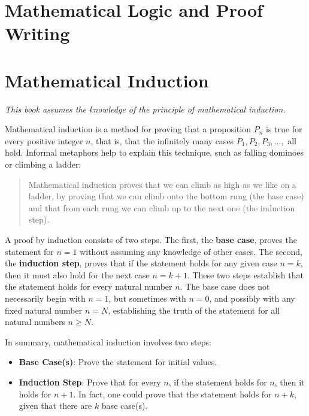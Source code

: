 \chapter{Mathematical Logic and Proof Writing}

\chapter{Mathematical Induction}
\textit{This book assumes the knowledge of the principle of mathematical induction.}

Mathematical induction is a method for proving that a proposition $P_n$ is true for every positive integer $n$, that is, that the infinitely many cases $P_1, P_2, P_3, \dots,$ all hold. Informal metaphors help to explain this technique, such as falling dominoes or climbing a ladder:
\begin{quote}
    Mathematical induction proves that we can climb as high as we like on a ladder, by proving that we can climb onto the bottom rung (the base case) and that from each rung we can climb up to the next one (the induction step).
\end{quote}

A proof by induction consists of two steps. The first, the \textbf{base case}, proves the statement for $n = 1$ without assuming any knowledge of other cases. The second, the \textbf{induction step}, proves that if the statement holds for any given case $n = k$, then it must also hold for the next case $n = k + 1$. These two steps establish that the statement holds for every natural number $n$. The base case does not necessarily begin with $n = 1$, but sometimes with $n = 0$, and possibly with any fixed natural number $n = N$, establishing the truth of the statement for all natural numbers $n \geq N$.

In summary, mathematical induction involves two steps:
\begin{itemize}
    \item \textbf{Base Case(s)}: Prove the statement for initial values.
    \item \textbf{Induction Step}: Prove that for every $n$, if the statement holds for $n$, then it holds for $n + 1$. In fact, one could prove that the statement holds for $n + k$, given that there are $k$ base case(s).
\end{itemize}

